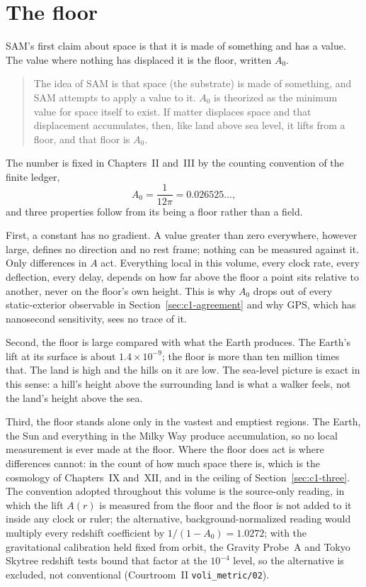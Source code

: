 \section{The floor}
\label{sec:c1-floor}

SAM's first claim about space is that it is made of something and has a value. The value where nothing has displaced it is the floor, written $A_0$.
\begin{quote}
The idea of SAM is that space (the substrate) is made of something, and SAM attempts to apply a value to it. $A_0$ is theorized as the minimum value for space itself to exist. If matter displaces space and that displacement accumulates, then, like land above sea level, it lifts from a floor, and that floor is $A_0$.
\end{quote}
The number is fixed in Chapters~II and~III by the counting convention of the finite ledger,
\begin{equation}
A_0=\frac{1}{12\pi}=0.026525\ldots,
\label{eq:c1-floor}
\end{equation}
and three properties follow from its being a floor rather than a field.

First, a constant has no gradient. A value greater than zero everywhere, however large, defines no direction and no rest frame; nothing can be measured against it. Only differences in $A$ act. Everything local in this volume, every clock rate, every deflection, every delay, depends on how far above the floor a point sits relative to another, never on the floor's own height. This is why $A_0$ drops out of every static-exterior observable in Section~\ref{sec:c1-agreement} and why GPS, which has nanosecond sensitivity, sees no trace of it.

Second, the floor is large compared with what the Earth produces. The Earth's lift at its surface is about $1.4\times10^{-9}$; the floor is more than ten million times that. The land is high and the hills on it are low. The sea-level picture is exact in this sense: a hill's height above the surrounding land is what a walker feels, not the land's height above the sea.

Third, the floor stands alone only in the vastest and emptiest regions. The Earth, the Sun and everything in the Milky Way produce accumulation, so no local measurement is ever made at the floor. Where the floor does act is where differences cannot: in the count of how much space there is, which is the cosmology of Chapters~IX and~XII, and in the ceiling of Section~\ref{sec:c1-three}. The convention adopted throughout this volume is the source-only reading, in which the lift $A(r)$ is measured from the floor and the floor is not added to it inside any clock or ruler; the alternative, background-normalized reading would multiply every redshift coefficient by $1/(1-A_0)=1.0272$; with the gravitational calibration held fixed from orbit, the Gravity Probe~A and Tokyo Skytree redshift tests bound that factor at the $10^{-4}$ level, so the alternative is excluded, not conventional (Courtroom~II \texttt{voli\_metric/02}).

